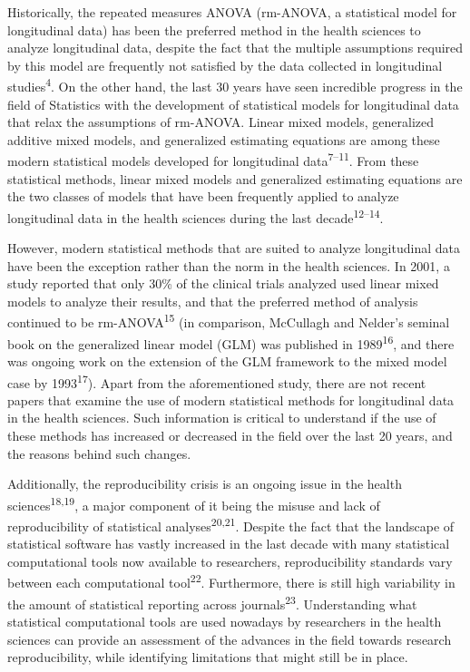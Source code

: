 \documentclass[
]{article}
\begin{document}
Historically, the repeated measures ANOVA (rm-ANOVA, a statistical model
for longitudinal data) has been the preferred method in the health
sciences to analyze longitudinal data, despite the fact that the
multiple assumptions required by this model are frequently not satisfied
by the data collected in longitudinal studies\textsuperscript{4}. On the
other hand, the last 30 years have seen incredible progress in the field
of Statistics with the development of statistical models for
longitudinal data that relax the assumptions of rm-ANOVA. Linear mixed
models, generalized additive mixed models, and generalized estimating
equations are among these modern statistical models developed for
longitudinal data\textsuperscript{7--11}. From these statistical
methods, linear mixed models and generalized estimating equations are
the two classes of models that have been frequently applied to analyze
longitudinal data in the health sciences during the last
decade\textsuperscript{12--14}.

However, modern statistical methods that are suited to analyze
longitudinal data have been the exception rather than the norm in the
health sciences. In 2001, a study reported that only 30\% of the
clinical trials analyzed used linear mixed models to analyze their
results, and that the preferred method of analysis continued to be
rm-ANOVA\textsuperscript{15} (in comparison, McCullagh and Nelder's
seminal book on the generalized linear model (GLM) was published in
1989\textsuperscript{16}, and there was ongoing work on the extension of
the GLM framework to the mixed model case by 1993\textsuperscript{17}).
Apart from the aforementioned study, there are not recent papers that
examine the use of modern statistical methods for longitudinal data in
the health sciences. Such information is critical to understand if the
use of these methods has increased or decreased in the field over the
last 20 years, and the reasons behind such changes.

Additionally, the reproducibility crisis is an ongoing issue in the
health sciences\textsuperscript{18,19}, a major component of it being
the misuse and lack of reproducibility of statistical
analyses\textsuperscript{20,21}. Despite the fact that the landscape of
statistical software has vastly increased in the last decade with many
statistical computational tools now available to researchers,
reproducibility standards vary between each computational
tool\textsuperscript{22}. Furthermore, there is still high variability
in the amount of statistical reporting across
journals\textsuperscript{23}. Understanding what statistical
computational tools are used nowadays by researchers in the health
sciences can provide an assessment of the advances in the field towards
research reproducibility, while identifying limitations that might still
be in place.
\end{document}

